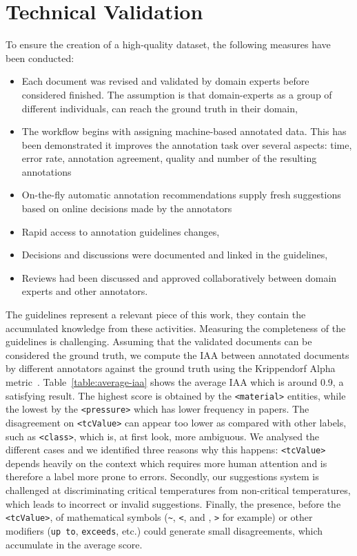 \documentclass[fleqn,10pt]{wlscirep}
\begin{document}
\label{sec:technical-validation}
\section*{Technical Validation} 
To ensure the creation of a high-quality dataset, the following measures have been conducted: 
\begin{itemize}
    \item Each document was revised and validated by domain experts before considered finished. The assumption is that domain-experts as a group of different individuals, can reach the ground truth in their domain, 
    \item The workflow begins with assigning machine-based annotated data. This has been demonstrated it improves the annotation task over several aspects: time, error rate, annotation agreement, quality and number of the resulting annotations~\cite{Fort2010InfluenceOP,Nvol2011SemiautomaticSA,Lingren2014EvaluatingTI}
    \item On-the-fly automatic annotation recommendations supply fresh suggestions based on online decisions made by the annotators
    \item Rapid access to annotation guidelines changes, 
    \item Decisions and discussions were documented and linked in the guidelines, 
    \item Reviews had been discussed and approved collaboratively between domain experts and other annotators.
\end{itemize}

The guidelines represent a relevant piece of this work, they contain the accumulated knowledge from these activities.
Measuring the completeness of the guidelines is challenging. 
Assuming that the validated documents can be considered the ground truth, we compute the IAA between annotated documents by different annotators against the ground truth using the Krippendorf Alpha metric~\cite{Krippendorff2004ReliabilityIC}.
Table~\ref{table:average-iaa} shows the average IAA which is around 0.9,  a satisfying result. 
The highest score is obtained by the \texttt{<material>} entities, while the lowest by the \texttt{<pressure>} which has lower frequency in papers. 
The disagreement on \texttt{<tcValue>} can appear too lower as compared with other labels, such as \texttt{<class>}, which is, at first look, more ambiguous. 
We analysed the different cases and we identified three reasons why this happens: \texttt{<tcValue>} depends heavily on the context which requires more human attention and is therefore a label more prone to errors. 
Secondly, our suggestions system is challenged at discriminating critical temperatures from non-critical temperatures, which leads to incorrect or invalid suggestions. 
Finally, the presence, before the \texttt{<tcValue>}, of mathematical symbols (\texttt{\~}, \texttt{<}, and , \texttt{>} for example) or other modifiers (\texttt{up to}, \texttt{exceeds}, etc.) could generate small disagreements, which accumulate in the average score. 
\end{document}
